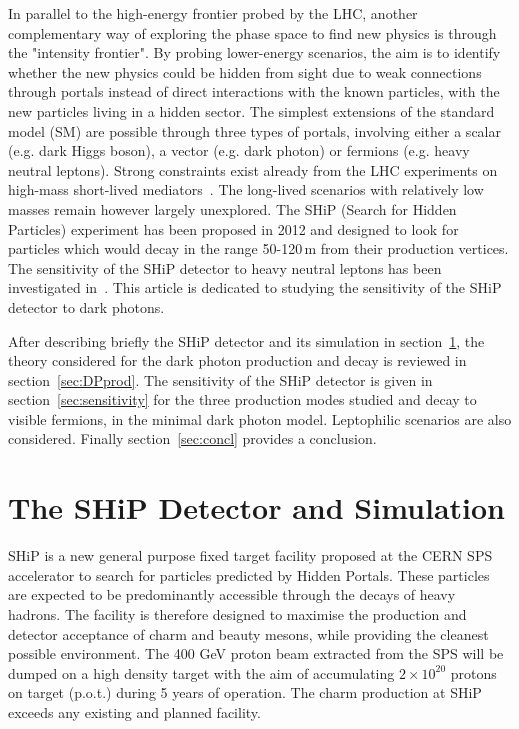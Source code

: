 \documentclass[12pt,a4paper,]{article}
\begin{document}

In parallel to the high-energy frontier probed by the LHC, another
complementary way of exploring the phase space to find new physics is
through the "intensity frontier". By probing lower-energy scenarios,
the aim is to identify whether the new physics could be hidden from
sight due to weak connections through portals instead of direct
interactions with the known particles, with the new particles living
in a hidden sector. The simplest extensions of the standard model (SM)
are possible through three types of portals, involving either a scalar
(e.g. dark Higgs boson), a vector (e.g. dark photon) or fermions
(e.g. heavy neutral leptons). Strong constraints exist already from
the LHC experiments on high-mass short-lived
mediators~\cite{Aaboud:2018fvk,Aaboud:2017buh,CMS-PAS-HIG-18-003,Khachatryan:2016zqb}. The
long-lived scenarios with relatively low masses remain however largely
unexplored. The SHiP (Search for Hidden Particles) experiment\cite{TP}
has been proposed in 2012 and designed to look for particles which
would decay in the range 50-120\,m from their production vertices. The
sensitivity of the SHiP detector to heavy neutral leptons has been
investigated in~\cite{SHiPPaper3}. This article is dedicated to
studying the sensitivity of the SHiP detector to dark photons.

After describing briefly the SHiP detector and its simulation in
section~\ref{sec:shipdetector}, the theory considered for the dark
photon production and decay is reviewed in
section~\ref{sec:DPprod}. The sensitivity of the SHiP detector is
given in section~\ref{sec:sensitivity} for the three production modes
studied and decay to visible fermions, in the minimal dark photon
model. Leptophilic scenarios are also considered. Finally
section~\ref{sec:concl} provides a conclusion.

\section{The SHiP Detector and Simulation}
\label{sec:shipdetector}

SHiP\cite{TP} is a new general purpose fixed target facility proposed
at the CERN SPS accelerator to search for particles predicted by
Hidden Portals.  These particles are expected to be predominantly
accessible through the decays of heavy hadrons. The facility is
therefore designed to maximise the production and detector acceptance
of charm and beauty mesons, while providing the cleanest possible
environment.  The 400 GeV proton beam extracted from the SPS will be
dumped on a high density target with the aim of accumulating $2\times
10^{20}$ protons on target (p.o.t.) during 5 years of operation.  The charm
production at SHiP exceeds any existing and planned facility.
\end{document}
